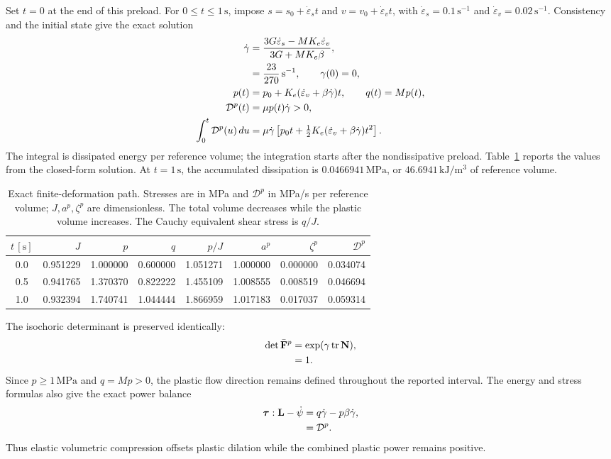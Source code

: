 \documentclass[11pt]{article}
\newcommand{\mbf}[1]{\mathbf{#1}}
\newcommand{\bs}[1]{\boldsymbol{#1}}
\newcommand{\tr}{\operatorname{tr}}
\begin{document}
Set \(t=0\) at the end of this preload. For \(0\le t\le1\,\mathrm{s}\),
impose \(s=s_0+\dot\varepsilon_s t\) and
\(v=v_0+\dot\varepsilon_v t\), with
\(\dot\varepsilon_s=0.1\,\mathrm{s}^{-1}\) and
\(\dot\varepsilon_v=0.02\,\mathrm{s}^{-1}\). Consistency and the initial
state give the exact solution
\begin{align}
 \dot\gamma&=\frac{3G\dot\varepsilon_s-MK_e\dot\varepsilon_v}
 {3G+MK_e\beta},\notag\\
 &=\frac{23}{270}\,\mathrm{s}^{-1},
 \qquad \gamma(0)=0, \label{eq:example_multiplier}\\
 p(t)&=p_0+K_e(\dot\varepsilon_v+\beta\dot\gamma)t,
 \qquad q(t)=Mp(t), \label{eq:example_stress_path}\\
 \mathcal D^p(t)&=\mu p(t)\dot\gamma>0,
 \notag\\
 \int_0^t\mathcal D^p(u)\,du
 &=\mu\dot\gamma\left[p_0t+
 \tfrac12K_e(\dot\varepsilon_v+\beta\dot\gamma)t^2\right].
 \notag
\end{align}
The integral is dissipated energy per reference volume; the integration starts
after the nondissipative preload. Table~\ref{tab:finite_example} reports the
values from the closed-form solution. At \(t=1\,\mathrm{s}\),
the accumulated dissipation is \(0.0466941\,\mathrm{MPa}\), or
\(46.6941\,\mathrm{kJ/m^3}\) of reference volume.

\begin{table}[htbp]
\centering
\small
\begin{tabular}{c r r r r r r r}
\hline
\(t\,[\mathrm{s}]\)&\(J\)&\(p\)&\(q\)&\(p/J\)&\(a^p\)&\(\zeta^p\)&\(\mathcal D^p\)\\
\hline
0.0 & 0.951229 & 1.000000 & 0.600000 & 1.051271 & 1.000000 & 0.000000 & 0.034074 \\
0.5 & 0.941765 & 1.370370 & 0.822222 & 1.455109 & 1.008555 & 0.008519 & 0.046694 \\
1.0 & 0.932394 & 1.740741 & 1.044444 & 1.866959 & 1.017183 & 0.017037 & 0.059314 \\
\hline
\end{tabular}
\caption{Exact finite-deformation path. Stresses are in MPa and
\(\mathcal D^p\) in MPa/s per reference volume; \(J,a^p,\zeta^p\)
are dimensionless. The total volume decreases while the plastic volume
increases. The Cauchy equivalent shear stress is \(q/J\).}
\label{tab:finite_example}
\end{table}

The isochoric determinant is preserved identically:
\begin{align}
 \det\bar{\mbf F}^p&=\exp(\gamma\tr\mbf N),\notag\\
 &=1.
 \label{eq:example_determinant}
\end{align}
Since \(p\ge1\,\mathrm{MPa}\) and \(q=Mp>0\), the plastic flow
direction remains defined throughout the reported interval. The energy and
stress formulas also give the exact power balance
\begin{align}
 \bs\tau:\mbf L-\dot\psi
 &=q\dot\gamma-p\beta\dot\gamma,\notag\\
 &=\mathcal D^p.
 \label{eq:example_power_check}
\end{align}
Thus elastic volumetric compression offsets plastic dilation while the
combined plastic power remains positive.
\end{document}
